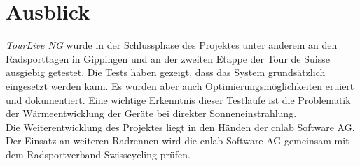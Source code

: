 \section*{Ausblick}
\textit{TourLive NG} wurde in der Schlussphase des Projektes unter anderem an den Radsporttagen in Gippingen und an der zweiten Etappe der Tour de Suisse ausgiebig getestet. Die Tests haben gezeigt, dass das System grundsätzlich eingesetzt werden kann. Es wurden aber auch  Optimierungsmöglichkeiten eruiert und dokumentiert. Eine wichtige Erkenntnis dieser Testläufe ist die Problematik der Wärmeentwicklung der Geräte bei direkter Sonneneinstrahlung.
\\ %

Die Weiterentwicklung des Projektes liegt in den Händen der cnlab Software AG. Der Einsatz an weiteren Radrennen wird die cnlab Software AG gemeinsam mit dem Radsportverband Swisscycling prüfen.

